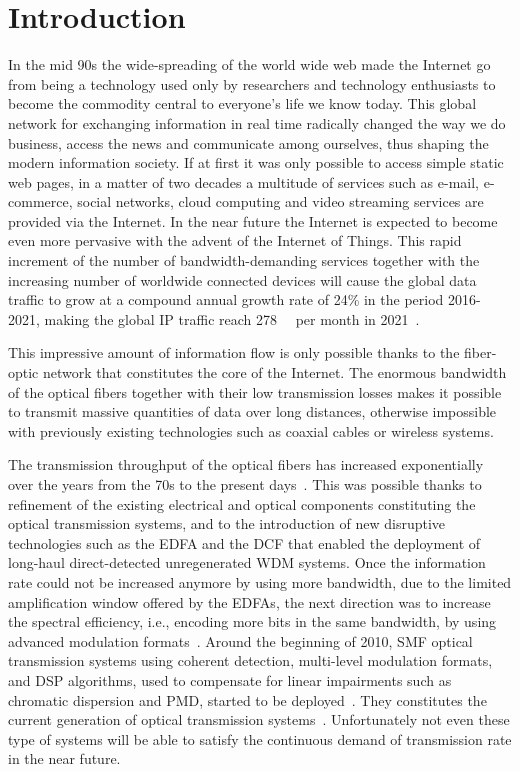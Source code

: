 \chapter{Introduction}\label{ch:introduction}

In the mid 90s the wide-spreading of the world wide web made the Internet go
from being a technology used only by researchers and technology enthusiasts to
become the commodity central to everyone's life we know today. This global
network for exchanging information in real time radically changed the way we do
business, access the news and communicate among ourselves, thus shaping the
modern information society. If at first it was only possible to access simple
static web pages, in a matter of two decades a multitude of services such as
e-mail, e-commerce, social networks, cloud computing and video streaming
services are provided via the Internet. In the near future the Internet is
expected to become even more pervasive with the advent of the Internet of
Things. This rapid increment of the number of bandwidth-demanding services
together with the increasing number of worldwide connected devices  will cause
the global data traffic to grow at a compound annual growth rate of 24\% in the
period 2016-2021, making the global IP traffic reach \SI{278}{\exa\byte} per
month in 2021~\cite{cisco2017cisco}.

This impressive amount of information flow is only possible thanks to the
fiber-optic network that constitutes the core of the Internet.  The enormous
bandwidth of the optical fibers together with their low transmission losses
makes it possible to transmit massive quantities of data over long distances, otherwise impossible with previously existing technologies such as coaxial
cables or wireless systems.

The transmission throughput of the optical fibers has increased exponentially over
the years from the 70s to the present days~\cite{agrawal2012fiber}. This was
possible thanks to refinement of the existing electrical and optical components
constituting the optical transmission systems, and to the introduction of new
disruptive technologies such as the \ac{EDFA} and the \ac{DCF} that enabled the
deployment of long-haul direct-detected unregenerated \ac{WDM} systems. Once the
information rate could not be increased anymore by using more bandwidth, due to
the limited amplification window offered by the \acp{EDFA}, the next direction
was to increase the spectral efficiency, i.e., encoding more bits in the same
bandwidth, by using advanced modulation formats~\cite{seimetz2009high}. Around
the beginning of 2010, \ac{SMF} optical transmission systems using coherent detection,
multi-level modulation formats, and \ac{DSP} algorithms, used to compensate for linear impairments such as chromatic dispersion and \ac{PMD}, started
to be deployed~\cite{coherent2013ciena}.  They constitutes the current
generation of optical transmission systems~\cite{Agrell2016a}.
Unfortunately not even these type of systems will be able to satisfy the continuous demand
of transmission rate in the near future.

